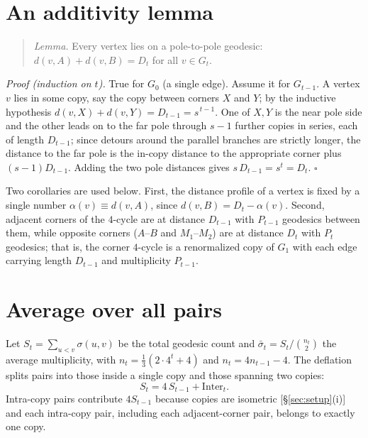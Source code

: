 \documentclass[aps,pre,onecolumn,superscriptaddress,floatfix]{revtex4-2}
\begin{document}
\section{An additivity lemma}
\label{sec:lemma}

\begin{quote}
\emph{Lemma.} Every vertex lies on a pole-to-pole geodesic:
$d(v,A)+d(v,B)=D_t$ for all $v\in G_t$.
\end{quote}

\noindent\emph{Proof (induction on $t$).} True for $G_0$ (a single edge).
Assume it for $G_{t-1}$. A vertex $v$ lies in some copy, say the copy between
corners $X$ and $Y$; by the inductive hypothesis
$d(v,X)+d(v,Y)=D_{t-1}=s^{\,t-1}$. One of $X,Y$ is the near pole side and the
other leads on to the far pole through $s-1$ further copies in series, each of
length $D_{t-1}$; since detours around the parallel branches are strictly
longer, the distance to the far pole is the in-copy distance to the appropriate
corner plus $(s-1)D_{t-1}$. Adding the two pole distances gives
$s\,D_{t-1}=s^{t}=D_t$. $\square$

Two corollaries are used below. First, the distance profile of a vertex is fixed
by a single number $\alpha(v)\equiv d(v,A)$, since $d(v,B)=D_t-\alpha(v)$.
Second, adjacent corners of the $4$-cycle are at distance $D_{t-1}$ with
$P_{t-1}$ geodesics between them, while opposite corners ($A$--$B$ and
$M_1$--$M_2$) are at distance $D_t$ with $P_t$ geodesics; that is, the corner
$4$-cycle is a renormalized copy of $G_1$ with each edge carrying length
$D_{t-1}$ and multiplicity $P_{t-1}$.

\section{Average over all pairs}
\label{sec:avg}

Let $S_t=\sum_{u<v}\sigma(u,v)$ be the total geodesic count and
$\bar\sigma_t=S_t/\binom{n_t}{2}$ the average multiplicity, with
$n_t=\tfrac13(2\cdot4^{t}+4)$ and $n_t=4n_{t-1}-4$. The deflation splits pairs
into those inside a single copy and those spanning two copies:
\begin{equation}
  S_t = 4\,S_{t-1} + \mathrm{Inter}_t .
  \label{eq:Srec}
\end{equation}
Intra-copy pairs contribute $4S_{t-1}$ because copies are isometric
[\S\ref{sec:setup}(i)] and each intra-copy pair, including each adjacent-corner
pair, belongs to exactly one copy.
\end{document}
